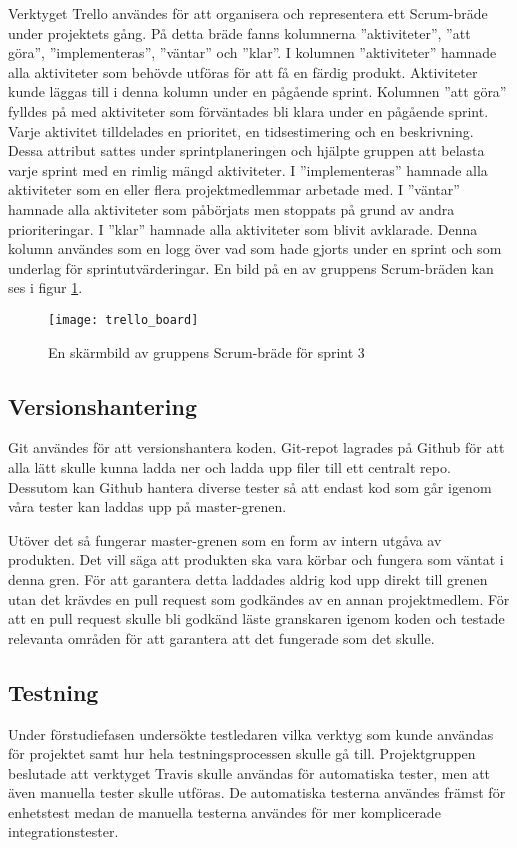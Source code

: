 Verktyget Trello användes för att organisera och representera ett Scrum-bräde under projektets gång. På detta bräde fanns kolumnerna ''aktiviteter'', ''att göra'', ''implementeras'', ''väntar'' och ''klar''. I kolumnen ''aktiviteter'' hamnade alla aktiviteter som behövde utföras för att få en färdig produkt. Aktiviteter kunde läggas till i denna kolumn under en pågående sprint. Kolumnen ''att göra'' fylldes på med aktiviteter som förväntades bli klara under en pågående sprint. Varje aktivitet tilldelades en prioritet, en tidsestimering och en beskrivning. Dessa attribut sattes under sprintplaneringen och hjälpte gruppen att belasta varje sprint med en rimlig mängd aktiviteter. I ''implementeras'' hamnade alla aktiviteter som en eller flera projektmedlemmar arbetade med. I ''väntar'' hamnade alla aktiviteter som påbörjats men stoppats på grund av andra prioriteringar. I ''klar'' hamnade alla aktiviteter som blivit avklarade. Denna kolumn användes som en logg över vad som hade gjorts under en sprint och som underlag för sprintutvärderingar. En bild på en av gruppens Scrum-bräden kan ses i figur \ref{fig:trello_board}.

\begin{figure}[h]
    \centering
    \texttt{[image: trello\_board]}
    \caption{En skärmbild av gruppens Scrum-bräde för sprint 3}
    \label{fig:trello_board}
\end{figure}

\subsection{Versionshantering}
Git användes för att versionshantera koden. Git-repot lagrades på Github för att alla lätt skulle kunna ladda ner och ladda upp filer till ett centralt repo. Dessutom kan Github hantera diverse tester så att endast kod som går igenom våra tester kan laddas upp på master-grenen.

Utöver det så fungerar master-grenen som en form av intern utgåva av produkten. Det vill säga att produkten ska vara körbar och fungera som väntat i denna gren. För att garantera detta laddades aldrig kod upp direkt till grenen utan det krävdes en pull request som godkändes av en annan projektmedlem. För att en pull request skulle bli godkänd läste granskaren igenom koden och testade relevanta områden för att garantera att det fungerade som det skulle.

\subsection{Testning}
Under förstudiefasen undersökte testledaren vilka verktyg som kunde användas för projektet samt hur hela testningsprocessen skulle gå till. Projektgruppen beslutade att verktyget Travis skulle användas för automatiska tester, men att även manuella tester skulle utföras. De automatiska testerna användes främst för enhetstest medan de manuella testerna användes för mer komplicerade integrationstester.

